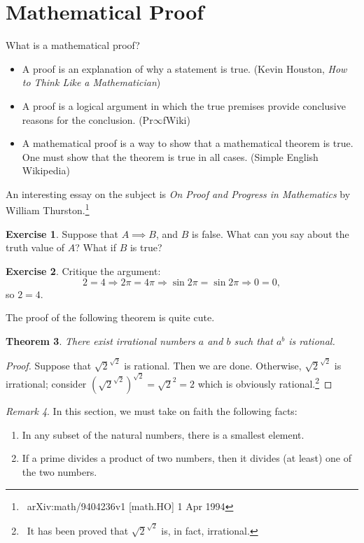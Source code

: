 \documentclass[a4paper, 10pt]{amsart}
\newtheorem{thm}{Theorem}[section]
\theoremstyle{definition}
\newtheorem{exercise}[thm]{Exercise}
\theoremstyle{remark}
\newtheorem{rem}[thm]{Remark}
\begin{document}
\section{Mathematical Proof}
What is a mathematical proof?
\begin{itemize}
  \item A proof is an explanation of why a statement is true. (Kevin Houston, \textit{How to Think Like a Mathematician})
  \item A proof is a logical argument in which the true premises provide conclusive reasons for the conclusion. (Pr$\infty$fWiki)
  \item A mathematical proof is a way to show that a mathematical theorem is true. One must show that the theorem is true in all cases. (Simple English Wikipedia)
\end{itemize}

An interesting essay on the subject is \textit{On Proof and Progress in Mathematics} by William Thurston.\footnote{~arXiv:math/9404236v1 [math.HO] 1 Apr 1994}

\begin{exercise}
  Suppose that $ A \implies B $, and $ B $ is false. What can you say about the truth value of $ A $? What if $ B $ is true?
\end{exercise}

\begin{exercise}
  Critique the argument:
  \begin{displaymath}
    2 = 4 \Rightarrow 2\pi = 4\pi \Rightarrow \sin 2\pi = \sin 2\pi \Rightarrow 0 = 0,
  \end{displaymath}
  so $ 2 = 4 $.
\end{exercise}

The proof of the following theorem is quite cute.

\begin{thm}
  There exist irrational numbers $ a $ and $ b $ such that $ a^b $ is rational.
\end{thm}
\begin{proof}
  Suppose that $ \sqrt{2}^{\sqrt{2}} $ is rational. Then we are done. Otherwise, $ \sqrt{2}^{\sqrt{2}} $ is irrational;
  consider $ (\sqrt{2}^{\sqrt{2}})^{\sqrt{2}} = \sqrt{2}^2 = 2 $ which is obviously rational.\footnote{~It has been proved
  that $ \sqrt{2}^{\sqrt{2}} $ is, in fact, irrational.}
\end{proof}

\begin{rem}
  In this section, we must take on faith the following facts:
  \begin{enumerate}
    \item In any subset of the natural numbers, there is a smallest element.
    \item If a prime divides a product of two numbers, then it divides (at least) one of the two numbers.
  \end{enumerate}
\end{rem}
\end{document}
